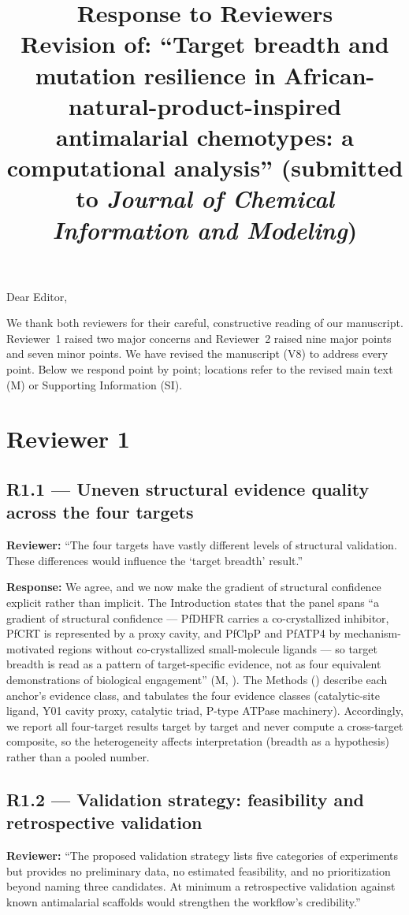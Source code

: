 \documentclass[11pt]{article}
\title{\bfseries Response to Reviewers\\[4pt]
\large Revision of: ``Target breadth and mutation resilience in
African-natural-product-inspired antimalarial chemotypes: a computational analysis''
(submitted to \emph{Journal of Chemical Information and Modeling})}
\author{}
\date{}
\begin{document}
\maketitle

\noindent Dear Editor,

We thank both reviewers for their careful, constructive reading of our manuscript.
Reviewer~1 raised two major concerns and Reviewer~2 raised nine major points and seven
minor points. We have revised the manuscript (V8) to address every point. Below we
respond point by point; locations refer to the revised main text (M) or Supporting
Information (SI).

\section*{Reviewer 1}

\subsection*{R1.1 --- Uneven structural evidence quality across the four targets}
\textbf{Reviewer:} ``The four targets have vastly different levels of structural validation.
These differences would influence the `target breadth' result.''

\textbf{Response:} We agree, and we now make the gradient of structural confidence explicit
rather than implicit. The Introduction states that the panel spans ``a gradient of structural
confidence --- PfDHFR carries a co-crystallized inhibitor, PfCRT is represented by a proxy
cavity, and PfClpP and PfATP4 by mechanism-motivated regions without co-crystallized
small-molecule ligands --- so target breadth is read as a pattern of target-specific evidence,
not as four equivalent demonstrations of biological engagement'' (M, ). The
Methods () describe each anchor's evidence class, and  tabulates the four
evidence classes (catalytic-site ligand, Y01 cavity proxy, catalytic triad, P-type ATPase
machinery). Accordingly, we report all four-target results target by target and never
compute a cross-target composite, so the heterogeneity affects interpretation (breadth as a
hypothesis) rather than a pooled number.

\subsection*{R1.2 --- Validation strategy: feasibility and retrospective validation}
\textbf{Reviewer:} ``The proposed validation strategy lists five categories of experiments but
provides no preliminary data, no estimated feasibility, and no prioritization beyond naming
three candidates. At minimum a retrospective validation against known antimalarial scaffolds
would strengthen the workflow's credibility.''
\end{document}
